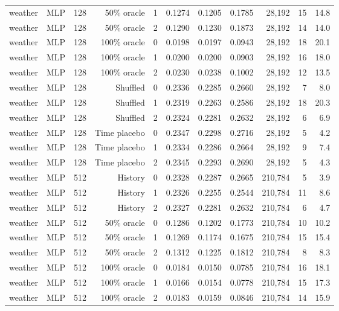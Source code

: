 \begin{landscape}
\begin{longtable}{@{}lllrlrrrrrr@{}}
weather & MLP & 128 & 50\% oracle & 1 & 0.1274 & 0.1205 & 0.1785 & 28,192 & 15 & 14.8 \\
weather & MLP & 128 & 50\% oracle & 2 & 0.1290 & 0.1230 & 0.1873 & 28,192 & 14 & 14.0 \\
weather & MLP & 128 & 100\% oracle & 0 & 0.0198 & 0.0197 & 0.0943 & 28,192 & 18 & 20.1 \\
weather & MLP & 128 & 100\% oracle & 1 & 0.0200 & 0.0200 & 0.0903 & 28,192 & 16 & 18.0 \\
weather & MLP & 128 & 100\% oracle & 2 & 0.0230 & 0.0238 & 0.1002 & 28,192 & 12 & 13.5 \\
weather & MLP & 128 & Shuffled & 0 & 0.2336 & 0.2285 & 0.2660 & 28,192 & 7 & 8.0 \\
weather & MLP & 128 & Shuffled & 1 & 0.2319 & 0.2263 & 0.2586 & 28,192 & 18 & 20.3 \\
weather & MLP & 128 & Shuffled & 2 & 0.2324 & 0.2281 & 0.2632 & 28,192 & 6 & 6.9 \\
weather & MLP & 128 & Time placebo & 0 & 0.2347 & 0.2298 & 0.2716 & 28,192 & 5 & 4.2 \\
weather & MLP & 128 & Time placebo & 1 & 0.2334 & 0.2286 & 0.2664 & 28,192 & 9 & 7.4 \\
weather & MLP & 128 & Time placebo & 2 & 0.2345 & 0.2293 & 0.2690 & 28,192 & 5 & 4.3 \\
weather & MLP & 512 & History & 0 & 0.2328 & 0.2287 & 0.2665 & 210,784 & 5 & 3.9 \\
weather & MLP & 512 & History & 1 & 0.2326 & 0.2255 & 0.2544 & 210,784 & 11 & 8.6 \\
weather & MLP & 512 & History & 2 & 0.2327 & 0.2281 & 0.2632 & 210,784 & 6 & 4.7 \\
weather & MLP & 512 & 50\% oracle & 0 & 0.1286 & 0.1202 & 0.1773 & 210,784 & 10 & 10.2 \\
weather & MLP & 512 & 50\% oracle & 1 & 0.1269 & 0.1174 & 0.1675 & 210,784 & 15 & 15.4 \\
weather & MLP & 512 & 50\% oracle & 2 & 0.1312 & 0.1225 & 0.1812 & 210,784 & 8 & 8.3 \\
weather & MLP & 512 & 100\% oracle & 0 & 0.0184 & 0.0150 & 0.0785 & 210,784 & 16 & 18.1 \\
weather & MLP & 512 & 100\% oracle & 1 & 0.0166 & 0.0154 & 0.0778 & 210,784 & 15 & 17.3 \\
weather & MLP & 512 & 100\% oracle & 2 & 0.0183 & 0.0159 & 0.0846 & 210,784 & 14 & 15.9 \\
\end{longtable}
\end{landscape}
